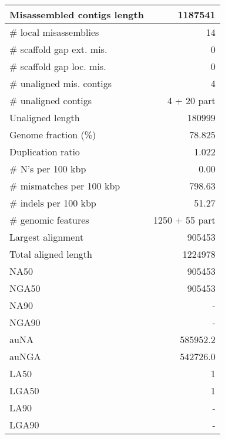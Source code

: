 \documentclass[12pt,a4paper]{article}
\begin{document}
\begin{table}[ht]
\begin{center}
\begin{tabular}{|l*{1}{|r}|}
Misassembled contigs length & 1187541 \\ \hline
\# local misassemblies & 14 \\ \hline
\# scaffold gap ext. mis. & 0 \\ \hline
\# scaffold gap loc. mis. & 0 \\ \hline
\# unaligned mis. contigs & 4 \\ \hline
\# unaligned contigs & 4 + 20 part \\ \hline
Unaligned length & 180999 \\ \hline
Genome fraction (\%) & 78.825 \\ \hline
Duplication ratio & 1.022 \\ \hline
\# N's per 100 kbp & 0.00 \\ \hline
\# mismatches per 100 kbp & 798.63 \\ \hline
\# indels per 100 kbp & 51.27 \\ \hline
\# genomic features & 1250 + 55 part \\ \hline
Largest alignment & 905453 \\ \hline
Total aligned length & 1224978 \\ \hline
NA50 & 905453 \\ \hline
NGA50 & 905453 \\ \hline
NA90 & - \\ \hline
NGA90 & - \\ \hline
auNA & 585952.2 \\ \hline
auNGA & 542726.0 \\ \hline
LA50 & 1 \\ \hline
LGA50 & 1 \\ \hline
LA90 & - \\ \hline
LGA90 & - \\ \hline
\end{tabular}
\end{center}
\end{table}
\end{document}
